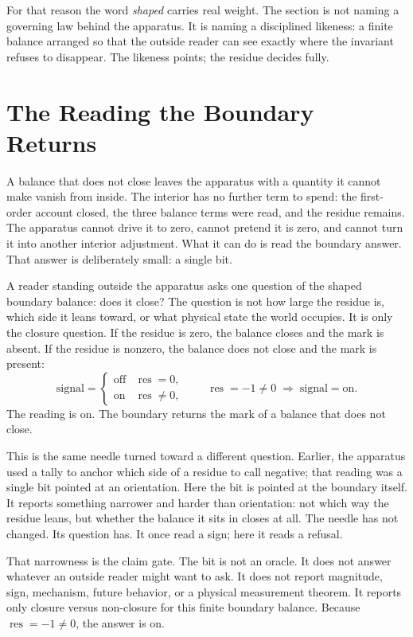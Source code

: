 For that reason the word \emph{shaped} carries real weight. The section is not naming a governing
law behind the apparatus. It is naming a disciplined likeness: a finite balance arranged so that
the outside reader can see exactly where the invariant refuses to disappear.
The likeness points; the residue decides fully.

\section{The Reading the Boundary Returns}

A balance that does not close leaves the apparatus with a quantity it cannot make vanish from
inside. The interior has no further term to spend: the first-order account closed, the three
balance terms were read, and the residue remains. The apparatus cannot drive it to zero, cannot
pretend it is zero, and cannot turn it into another interior adjustment. What it can do is read the
boundary answer. That answer is deliberately small: a single bit.

A reader standing outside the apparatus asks one question of the shaped boundary balance: does it
close? The question is not how large the residue is, which side it leans toward, or what physical
state the world occupies. It is only the closure question. If the residue is zero, the balance
closes and the mark is absent. If the residue is nonzero, the balance does not close and the mark
is present:
\[
  \text{signal} =
  \begin{cases}
    \text{off} & \operatorname{res} = 0,\\[2pt]
    \text{on}  & \operatorname{res} \neq 0,
  \end{cases}
  \qquad
  \operatorname{res} = -1 \neq 0
  \;\Longrightarrow\;
  \text{signal} = \text{on}.
\]
The reading is on. The boundary returns the mark of a balance that does not close.

This is the same needle turned toward a different question. Earlier, the apparatus used a tally to
anchor which side of a residue to call negative; that reading was a single bit pointed at an
orientation. Here the bit is pointed at the boundary itself. It reports something narrower and
harder than orientation: not which way the residue leans, but whether the balance it sits in closes
at all. The needle has not changed. Its question has. It once read a sign; here it reads a refusal.

That narrowness is the claim gate. The bit is not an oracle. It does not answer whatever an outside
reader might want to ask. It does not report magnitude, sign, mechanism, future behavior, or a
physical measurement theorem. It reports only closure versus non-closure for this finite boundary
balance. Because \(\operatorname{res}=-1\neq 0\), the answer is on.

